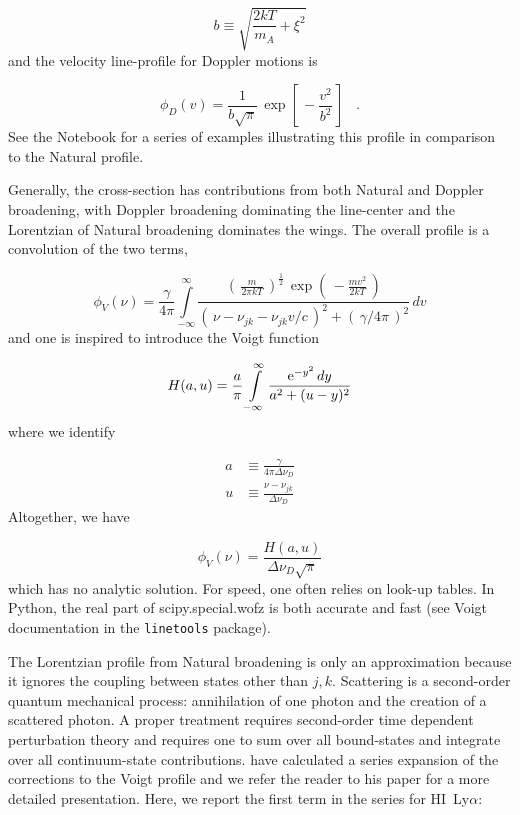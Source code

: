 \documentclass[graybox]{svmult}
\newcommand{\HI}{H{\sc I}}
\def\lya{Ly$\alpha$}
\def\ohf{\frac{1}{2}}
\def\ltk{\left [ \,}
\def\ltp{\left ( \,}
\def\rtk{\, \right  ] }
\def\rtp{\, \right  ) }
\def\perd{\;\;\; .}
\def\intl{\int\limits}
\def\rme{{\rm e}}
\begin{document}
\begin{equation}
b \equiv \sqrt{\frac{2kT}{m_A} + \xi^2}
\end{equation}
and the velocity line-profile for Doppler motions is

\begin{equation}
\phi_D(v) = \frac{1}{b\sqrt{\pi}} \, \exp \ltk -\frac{v^2}{b^2} \rtk \perd
\label{eqn:phi_Dv}
\end{equation}
See the Notebook for a series of examples illustrating this
profile in comparison to the Natural profile.


Generally, the cross-section has contributions from both
Natural and Doppler broadening,
with Doppler broadening dominating the line-center 
and the Lorentzian of Natural broadening dominates the wings.
The overall profile is a convolution of the two terms,

\begin{equation}
\phi_V(\nu) = \frac{\gamma}{4\pi} \intl_{-\infty}^\infty
\frac{ \ltp \frac{m}{2\pi kT} \rtp^\ohf \, \exp \ltp - \frac{mv^2}{2kT} \rtp}
{\ltp \nu-\nu_{jk}-\nu_{jk}v/c \rtp^2 + \ltp \gamma/4\pi \rtp^2} \, dv
\end{equation}
and one is inspired to introduce the Voigt function

\begin{equation}
H(a,u) = \frac{a}{\pi} \intl_{-\infty}^\infty 
\frac{\rme^{-y^2} \, dy}{a^2 + (u-y)^2}
\end{equation}
where we identify

\begin{align}
a &\equiv \frac{\gamma}{4\pi \Delta\nu_D} \\
u &\equiv \frac{\nu-\nu_{jk}}{\Delta\nu_D}
\end{align}
Altogether, we have 

\begin{equation}
\phi_V(\nu) = \frac{H(a,u)}{\Delta\nu_D \sqrt{\pi}}
\end{equation}
which has no analytic solution.
For speed, one often relies on look-up tables.
In Python, the real part of scipy.special.wofz is both accurate 
and fast (see Voigt documentation in the {\tt linetools} package).

The Lorentzian profile from Natural broadening is only an approximation
because it ignores the coupling between states other than $j,k$.
Scattering is a second-order quantum mechanical process: annihilation of 
one photon and the creation of a scattered photon.
A proper treatment requires second-order time dependent perturbation
theory and requires one to sum over all bound-states and integrate over
all continuum-state contributions.
\cite{lee03} have calculated a series expansion of the corrections
to the Voigt profile and we refer the reader to his paper for a
more detailed presentation.  Here, we report the first term
in the series for \HI\ \lya:
\end{document}
